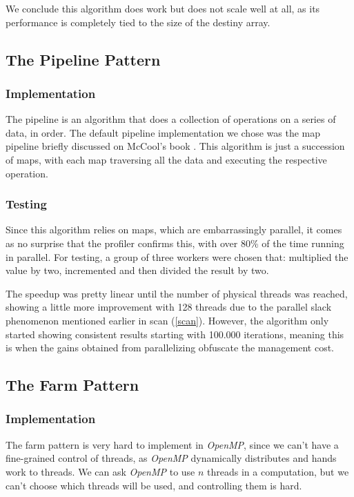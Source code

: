 \documentclass[10pt,journal]{IEEEtran}
\begin{document}
We conclude this algorithm does work but does not scale well at all, as its performance is completely tied to the size of the destiny array.

\subsection{The Pipeline Pattern}
\subsubsection{Implementation}

The pipeline is an algorithm that does a collection of operations on a series of data, in order. The default pipeline implementation we chose was the map pipeline briefly discussed on McCool's book \cite{mccool}. This algorithm is just a succession of maps, with each map traversing all the data and executing the respective operation.

\subsubsection{Testing}

Since this algorithm relies on maps, which are embarrassingly parallel, it comes as no surprise that the profiler confirms this, with over 80\% of the time running in parallel. For testing, a group of three workers were chosen that: multiplied the value by two, incremented and then divided the result by two.

The speedup was pretty linear until the number of physical threads was reached, showing a little more improvement with 128 threads due to the parallel slack phenomenon mentioned earlier in scan (\ref{scan}). However, the algorithm only started showing consistent results starting with 100.000 iterations, meaning this is when the gains obtained from parallelizing obfuscate the management cost.

\subsection{The Farm Pattern}
\subsubsection{Implementation}

The farm pattern is very hard to implement in \textit{OpenMP}, since we can't have a fine-grained control of threads, as \textit{OpenMP} dynamically distributes and hands work to threads. We can ask \textit{OpenMP} to use $ n $ threads in a computation, but we can't choose which threads will be used, and controlling them is hard.
\end{document}

